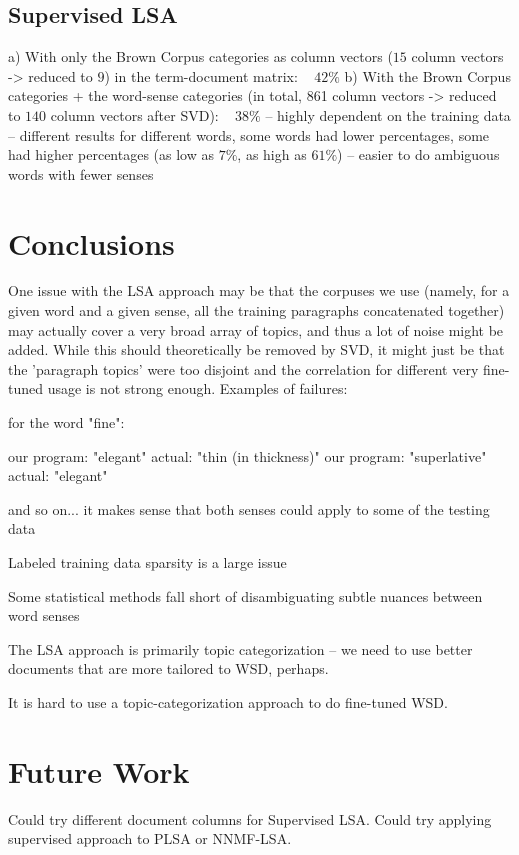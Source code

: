 \documentclass[10pt, letterpaper]{article}
\begin{document}
	\subsection{Supervised LSA}

	a) With only the Brown Corpus categories as column vectors ($15$ column vectors -> reduced to $9$) in the term-document matrix: ~ $42\%$
	b) With the Brown Corpus categories + the word-sense categories (in total, 861 column vectors -> reduced to $140$ column vectors after SVD): ~ $38\%$
	-- highly dependent on the training data -- different results for different words, some words had lower percentages, some had higher percentages (as low as $7\%$, as high as $61\%$)
	-- easier to do ambiguous words with fewer senses

	\section{Conclusions}
	One issue with the LSA approach may be that the corpuses we use (namely, for a given word and a given sense, all the training paragraphs concatenated together) may actually cover a very broad array of topics, and thus a lot of noise might be added. While this should theoretically be removed by SVD, it might just be that the 'paragraph topics' were too disjoint and the correlation for different very fine-tuned usage is not strong enough. 
	Examples of failures: 

	for the word "fine": 	

	our program: "elegant"  actual: "thin (in thickness)"
	our program: "superlative" actual: "elegant" 	

	and so on... it makes sense that both senses could apply to some of the testing data

	Labeled training data sparsity is a large issue

	Some statistical methods fall short of disambiguating subtle nuances between word senses	

	The LSA approach is primarily topic categorization -- we need to use better documents that are more tailored to WSD, perhaps. 	

	It is hard to use a topic-categorization approach to do fine-tuned WSD. 

	\section{Future Work}
	Could try different document columns for Supervised LSA.
	Could try applying supervised approach to PLSA or NNMF-LSA.	
\end{document}
